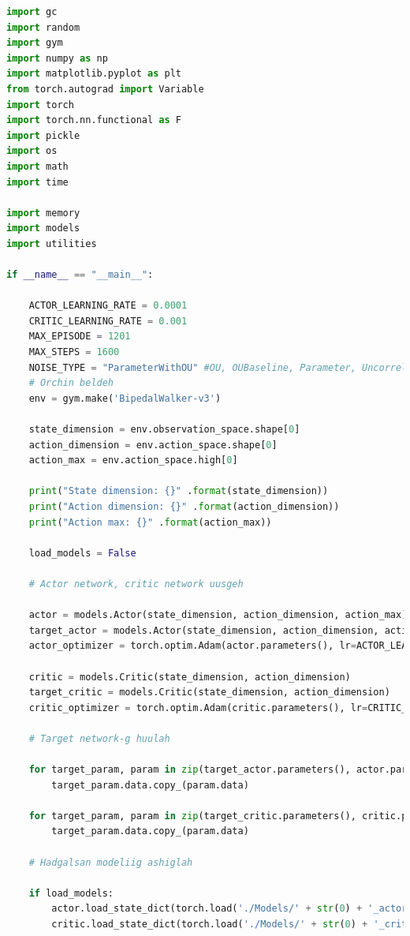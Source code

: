 \documentclass[12pt,A4]{report}
\begin{document}
\begin{lstlisting}[language=Python, caption=main.py, frame=single]
import gc
import random
import gym
import numpy as np
import matplotlib.pyplot as plt
from torch.autograd import Variable
import torch
import torch.nn.functional as F
import pickle
import os
import math
import time

import memory
import models
import utilities

if __name__ == "__main__":

    ACTOR_LEARNING_RATE = 0.0001
    CRITIC_LEARNING_RATE = 0.001
    MAX_EPISODE = 1201
    MAX_STEPS = 1600
    NOISE_TYPE = "ParameterWithOU" #OU, OUBaseline, Parameter, Uncorrelated, NoNoise, ParameterWithOU
    # Orchin beldeh
    env = gym.make('BipedalWalker-v3')

    state_dimension = env.observation_space.shape[0]
    action_dimension = env.action_space.shape[0]
    action_max = env.action_space.high[0]

    print("State dimension: {}" .format(state_dimension))
    print("Action dimension: {}" .format(action_dimension))
    print("Action max: {}" .format(action_max))

    load_models = False

    # Actor network, critic network uusgeh

    actor = models.Actor(state_dimension, action_dimension, action_max)
    target_actor = models.Actor(state_dimension, action_dimension, action_max)
    actor_optimizer = torch.optim.Adam(actor.parameters(), lr=ACTOR_LEARNING_RATE)

    critic = models.Critic(state_dimension, action_dimension)
    target_critic = models.Critic(state_dimension, action_dimension)
    critic_optimizer = torch.optim.Adam(critic.parameters(), lr=CRITIC_LEARNING_RATE)

    # Target network-g huulah

    for target_param, param in zip(target_actor.parameters(), actor.parameters()):
        target_param.data.copy_(param.data)

    for target_param, param in zip(target_critic.parameters(), critic.parameters()):
        target_param.data.copy_(param.data)

    # Hadgalsan modeliig ashiglah

    if load_models:
        actor.load_state_dict(torch.load('./Models/' + str(0) + '_actor.pt'))
        critic.load_state_dict(torch.load('./Models/' + str(0) + '_critic.pt'))


\end{lstlisting}
\end{document}
